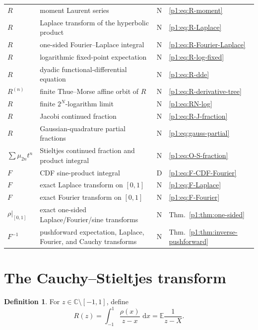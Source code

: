\documentclass[11pt]{article}
\theoremstyle{definition}
\newtheorem{definition}[theorem]{Definition}
\theoremstyle{remark}
\newcommand{\C}{\mathbb C}
\newcommand{\E}{\mathbb E}
\newcommand{\dd}{\,\mathrm d}
\newcommand{\statusderived}{\textsf{D}}
\newcommand{\statusnew}{\textsf{N}}
\begin{document}
\begin{longtable}{@{}p{}p{}p{}p{}@{}}
\(R\) & moment Laurent series & \statusnew & \eqref{p1:eq:R-moment} \\
\(R\) & Laplace transform of the hyperbolic product & \statusnew & \eqref{p1:eq:R-Laplace} \\
\(R\) & one-sided Fourier--Laplace integral & \statusnew & \eqref{p1:eq:R-Fourier-Laplace} \\
\(R\) & logarithmic fixed-point expectation & \statusnew & \eqref{p1:eq:R-log-fixed} \\
\(R\) & dyadic functional-differential equation & \statusnew & \eqref{p1:eq:R-dde} \\
\(R^{(n)}\) & finite Thue--Morse affine orbit of \(R\) & \statusnew & \eqref{p1:eq:R-derivative-tree} \\
\(R\) & finite \(2^N\)-logarithm limit & \statusnew & \eqref{p1:eq:RN-log} \\
\(R\) & Jacobi continued fraction & \statusnew & \eqref{p1:eq:R-J-fraction} \\
\(R\) & Gaussian-quadrature partial fractions & \statusnew & \eqref{p1:eq:gauss-partial} \\
\(\sum\mu_{2n}t^n\) & Stieltjes continued fraction and product integral & \statusnew & \eqref{p1:eq:O-S-fraction} \\
\(F\) & CDF sine-product integral & \statusderived & \eqref{p1:eq:F-CDF-Fourier} \\
\(F\) & exact Laplace transform on \([0,1]\) & \statusnew & \eqref{p1:eq:F-Laplace} \\
\(F\) & exact Fourier transform on \([0,1]\) & \statusnew & \eqref{p1:eq:F-Fourier} \\
\(\rho|_{[0,1]}\) & exact one-sided Laplace/Fourier/sine transforms & \statusnew & Thm.~\ref{p1:thm:one-sided} \\
\(F^{-1}\) & pushforward expectation, Laplace, Fourier, and Cauchy transforms & \statusnew & Thm.~\ref{p1:thm:inverse-pushforward} \\
\bottomrule
\end{longtable}
\normalsize

\section{The Cauchy--Stieltjes transform}\label{p1:sec:cauchy}

\begin{definition}
For \(z\in\C\setminus[-1,1]\), define
\begin{equation}
 R(z)=\int_{-1}^{1}\frac{\rho(x)}{z-x}\,\dd x=\E\frac1{z-X}. \label{p1:eq:R-def}
\end{equation}
\end{definition}
\end{document}
